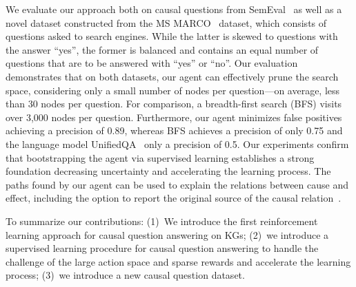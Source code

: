 We evaluate our approach both on causal questions from SemEval~\cite{Hendrickx2010SemEval} as well as a novel dataset constructed from the MS MARCO~\cite{Heindorf2020Causenet, Nguyen2016MSMARCO} dataset, which consists of questions asked to search engines. While the latter is skewed to questions with the answer ``yes'', the former is balanced and contains an equal number of questions that are to be answered with ``yes'' or ``no''. Our evaluation demonstrates that on both datasets, our agent can effectively prune the search space, considering only a small number of nodes per question---on average, less than 30 nodes per question. For comparison, a breadth-first search (BFS) visits over 3,000 nodes per question. Furthermore, our agent minimizes false positives achieving a precision of 0.89, whereas BFS achieves a precision of only 0.75 and the language model UnifiedQA~\cite{Khashabi2020UnifiedQA, Khashabi2022UnifiedQA2} only a precision of 0.5. Our experiments confirm that bootstrapping the agent via supervised learning establishes a strong foundation decreasing uncertainty and accelerating the learning process. The paths found by our agent can be used to explain the relations between cause and effect, including the option to report the original source of the causal relation~\cite{Heindorf2020Causenet}.

To summarize our contributions:
(1)~We introduce the first reinforcement learning approach for causal question answering on KGs;
(2)~we introduce a supervised learning procedure for causal question answering to handle the challenge of the large action space and sparse rewards and accelerate the learning process;
(3)~we introduce a new causal question dataset.
